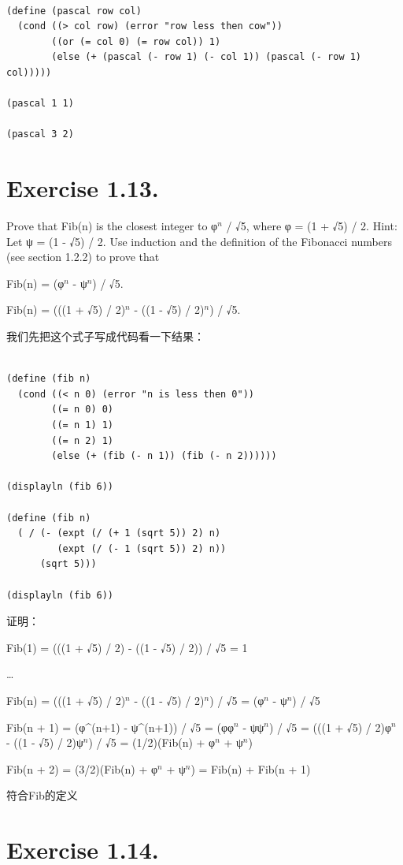 \documentclass[11pt]{article}
\begin{document}
\begin{verbatim}

(define (pascal row col)
  (cond ((> col row) (error "row less then cow"))
        ((or (= col 0) (= row col)) 1)
        (else (+ (pascal (- row 1) (- col 1)) (pascal (- row 1) col)))))

(pascal 1 1)

(pascal 3 2)
\end{verbatim}
\section{Exercise 1.13.}
\label{sec-13}


 Prove that Fib(n) is the closest integer to φ$^n$ / √5, where φ = (1 + √5) / 2.
 Hint: Let ψ = (1 - √5) / 2. Use induction and the definition of the Fibonacci
 numbers (see section 1.2.2) to prove that

 Fib(n) = (φ$^n$ - ψ$^n$) / √5.


 Fib(n) = (((1 + √5) / 2)$^n$ - ((1 - √5) / 2)$^n$) / √5.

 我们先把这个式子写成代码看一下结果：



\begin{verbatim}

(define (fib n)
  (cond ((< n 0) (error "n is less then 0"))
        ((= n 0) 0)
        ((= n 1) 1)
        ((= n 2) 1)
        (else (+ (fib (- n 1)) (fib (- n 2))))))

(displayln (fib 6))

(define (fib n)
  ( / (- (expt (/ (+ 1 (sqrt 5)) 2) n)
         (expt (/ (- 1 (sqrt 5)) 2) n))
      (sqrt 5)))

(displayln (fib 6))
\end{verbatim}


证明：

 Fib(1) = (((1 + √5) / 2) - ((1 - √5) / 2)) / √5 = 1

 \ldots{}

 Fib(n) = (((1 + √5) / 2)$^n$ - ((1 - √5) / 2)$^n$) / √5 = (φ$^n$ - ψ$^n$) / √5

 Fib(n + 1) = (φ^(n+1) - ψ^(n+1)) / √5 = (φφ$^n$ - ψψ$^n$) / √5 =
              (((1 + √5) / 2)φ$^n$ - ((1 - √5) / 2)ψ$^n$) / √5 =
              (1/2)(Fib(n) + φ$^n$ + ψ$^n$)

 Fib(n + 2) = (3/2)(Fib(n) + φ$^n$ + ψ$^n$) = Fib(n) + Fib(n + 1)

 符合Fib的定义
\section{Exercise 1.14.}
\label{sec-14}
\end{document}
